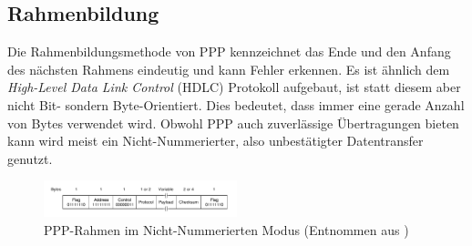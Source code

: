 \documentclass[journal,11pt]{IEEEtran}
\begin{document}
\subsection{Rahmenbildung}
Die Rahmenbildungsmethode von PPP kennzeichnet das Ende und den Anfang des nächsten Rahmens eindeutig und kann Fehler erkennen. Es ist ähnlich dem \textit{High-Level Data Link Control} (HDLC) Protokoll aufgebaut, ist statt diesem aber nicht Bit- sondern Byte-Orientiert. Dies bedeutet, dass immer eine gerade Anzahl von Bytes verwendet wird. Obwohl PPP auch zuverlässige Übertragungen bieten kann wird meist ein Nicht-Nummerierter, also unbestätigter Datentransfer genutzt.

\begin{figure}[h!]
 \centering
  \includegraphics[width=0.5\textwidth]{img/ppprahmen}
 \caption{PPP-Rahmen im Nicht-Nummerierten Modus (Entnommen aus \cite{compnetzw})}
 \label{fig:ppprahmen}
\end{figure}
\end{document}
